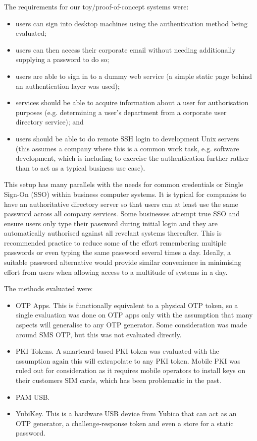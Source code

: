 \documentclass{report}
\begin{document}
The requirements for our toy/proof-of-concept systems were:

\begin{itemize}
  \item users can sign into desktop machines using the authentication method
    being evaluated;
  \item users can then access their corporate email without needing additionally
    supplying a password to do so;
  \item users are able to sign in to a dummy web service (a simple static page
    behind an authentication layer was used);
  \item services should be able to acquire information about a user for
    authorisation purposes (e.g. determining a user's department from
    a corporate user directory service); and
  \item users should be able to do remote SSH login to development Unix
    servers (this assumes a company where this is a common work task, e.g.
    software development, which is including to exercise the authentication
    further rather than to act as a typical business use case).
\end{itemize}

This setup has many parallels with the needs for common credentials or
Single Sign-On (SSO) within business computer systems. It is typical for
companies to have an authoritative directory server so that users
can at least use the same password across all company services. Some businesses
attempt true SSO and ensure users only type their password during initial
login and they are automatically authorised against all revelant systems
thereafter. This is recommended practice to reduce some of the effort
remembering multiple passwords or even typing the same password several times
a day. Ideally, a suitable password alternative would provide similar
convenience in minimising effort from users when allowing access to a multitude
of systems in a day.

The methods evaluated were:

\begin{itemize}
  \item OTP Apps. This is functionally equivalent to a physical OTP token,
    so a single evaluation was done on OTP apps only with the assumption that
    many aspects will generalise to any OTP generator. Some consideration
    was made around SMS OTP, but this was not evaluated directly.
  \item PKI Tokens. A smartcard-based PKI token was evaluated with the
    assumption again this will extrapolate to any PKI token. Mobile PKI was
    ruled out for consideration as it requires mobile operators to install
    keys on their customers SIM cards, which has been problematic in the
    past.
  \item PAM USB.
  \item YubiKey. This is a hardware USB device from Yubico that can act
    as an OTP generator, a challenge-response token and even a store
    for a static password.
\end{itemize}
\end{document}
